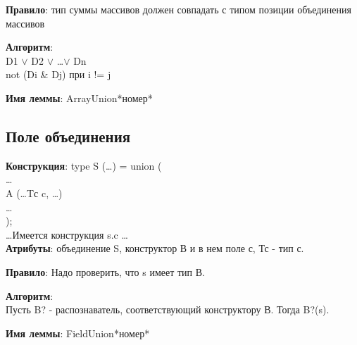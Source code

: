 \documentclass[12pt,a4paper]{article}
\begin{document}
\textbf{Правило}: тип суммы массивов должен совпадать с типом позиции объединения массивов

\textbf{Алгоритм}: \\
D1 $\vee$ D2 $\vee$ \dots $\vee$ Dn \\
not (Di \& Dj) при i != j

\textbf{Имя леммы}: ArrayUnion*номер*


\subsection{Поле объединения}
\textbf{Конструкция}:
type S (\dots) = union ( \\
\dots \\
A (\dots Tс c, \dots) \\
\dots \\
); \\

\dots Имеется конструкция s.c \dots \\

\textbf{Атрибуты}: объединение S, конструктор В и в нем поле с, Тс - тип с.

\textbf{Правило}: Надо проверить, что s имеет тип В.

\textbf{Алгоритм}: \\
Пусть B? - распознаватель, соответствующий конструктору В. Тогда B?(s).

\textbf{Имя леммы}: FieldUnion*номер*
\end{document}
